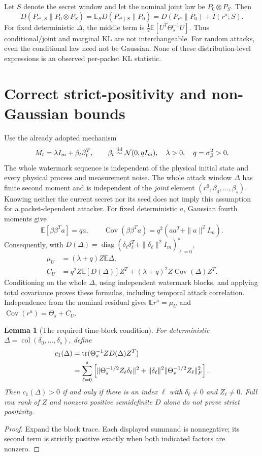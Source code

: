 \documentclass[11pt,a4paper]{article}
\newtheorem{lemma}[proposition]{Lemma}
\DeclareMathOperator{\col}{col}
\DeclareMathOperator{\Cov}{Cov}
\DeclareMathOperator{\tr}{tr}
\newcommand{\E}{\mathbb E}
\begin{document}
Let $S$ denote the secret window and let the nominal joint law be
$P_0\otimes P_S$. Then
\begin{equation}
 D(P_{r^a,S}\|P_0\otimes P_S)
 =\E_S D(P_{r^a\mid S}\|P_0)
 =D(P_{r^a}\|P_0)+I(r^a;S).\label{rev:jointKL}
\end{equation}
For fixed deterministic $\Delta$, the middle term is
$\frac12\E[U^T\Theta_s^{-1}U]$. Thus conditional/joint and marginal
KL are not interchangeable. For random attacks, even the conditional law
need not be Gaussian. None of these distribution-level expressions is
an observed per-packet KL statistic.

\section{Correct strict-positivity and non-Gaussian bounds}
\label{rev:positivity}
Use the already adopted mechanism
\[
 M_t=\lambda I_m+\beta_t\beta_t^T,\qquad
 \beta_t\overset{\rm iid}{\sim}\mathcal N(0,qI_m),\quad
 \lambda>0,\quad q=\sigma_\beta^2>0.
\]
The whole watermark sequence is independent of the physical initial state
and every physical process and measurement noise.
The whole attack window $\Delta$ has finite second moment and is independent
of the \emph{joint} element $(r^0,\beta_0,\ldots,\beta_s)$.
Knowing neither the current secret nor its seed does not imply this
assumption for a packet-dependent attacker. For fixed deterministic $a$,
Gaussian fourth moments give
\[
 \E[\beta\beta^Ta]=qa,\qquad
 \Cov(\beta\beta^Ta)=q^2(aa^T+\|a\|^2I_m).
\]
Consequently, with
$D(\Delta)=\operatorname{diag}(\delta_\ell\delta_\ell^T+
\|\delta_\ell\|^2I_m)_{\ell=0}^s$,
\begin{align}
 \mu_U&=(\lambda+q)Z\E\Delta,\label{rev:mu}\\
 C_U&=q^2Z\E[D(\Delta)]Z^T
       +(\lambda+q)^2Z\Cov(\Delta)Z^T.\label{rev:C}
\end{align}
Conditioning on the whole $\Delta$, using independent watermark blocks,
and applying total covariance proves these formulas, including temporal
attack correlation. Independence from the nominal residual gives
$\E r^a=\mu_U$ and $\Cov(r^a)=\Theta_s+C_U$.

\begin{lemma}[The required time-block condition]
\label{rev:c1}
For deterministic $\Delta=\col(\delta_0,\ldots,\delta_s)$, define
\begin{align}
 c_1(\Delta)&=\tr(\Theta_s^{-1}ZD(\Delta)Z^T)\notag\\
 &=\sum_{\ell=0}^s\left[
   \|\Theta_s^{-1/2}Z_\ell\delta_\ell\|^2
   +\|\delta_\ell\|^2\|\Theta_s^{-1/2}Z_\ell\|_F^2\right].
 \label{rev:c1formula}
\end{align}
Then $c_1(\Delta)>0$ if and only if there is an index $\ell$ with
$\delta_\ell\ne0$ and $Z_\ell\ne0$. Full row rank of $Z$ and
nonzero positive semidefinite $D$ alone do not prove strict positivity.
\end{lemma}
\begin{proof}
Expand the block trace. Each displayed summand is nonnegative; its second
term is strictly positive exactly when both indicated factors are nonzero.
\end{proof}
\end{document}

